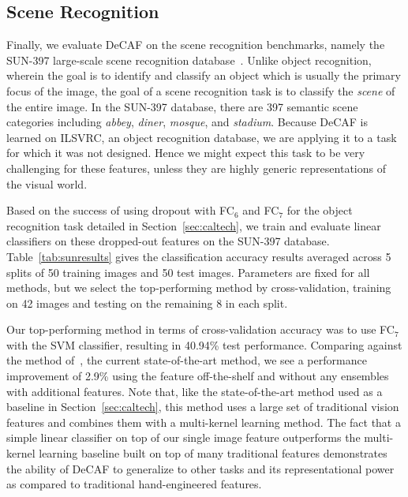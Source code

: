 \subsection{Scene Recognition}
Finally, we evaluate DeCAF on the scene recognition benchmarks, namely the SUN-397 large-scale scene recognition database~\cite{xiao10}. Unlike object recognition, wherein the goal is to identify and classify an object which is usually the primary focus of the image, the goal of a scene recognition task is to classify the \textit{scene} of the entire image.
In the SUN-397 database, there are 397 semantic scene categories including \textit{abbey}, \textit{diner}, \textit{mosque}, and \textit{stadium}.
Because DeCAF is learned on ILSVRC, an object recognition database, we are applying it to a task for which it was not designed.
Hence we might expect this task to be very challenging for these features, unless they are highly generic representations of the visual world.

Based on the success of using dropout with FC$_6$ and FC$_7$ for the object recognition task detailed in Section~\ref{sec:caltech}, we train and evaluate linear classifiers on these dropped-out features on the SUN-397 database.
Table~\ref{tab:sunresults} gives the classification accuracy results averaged across 5 splits of 50 training images and 50 test images.
Parameters are fixed for all methods, but we select the top-performing method by cross-validation, training on 42 images and testing on the remaining 8 in each split.

Our top-performing method in terms of cross-validation accuracy was to use FC$_7$ with the SVM classifier, resulting in 40.94\% test performance.
Comparing against the method of~\cite{xiao10}, the current state-of-the-art method, we see a performance improvement of 2.9\% using the feature off-the-shelf and without any ensembles with additional features.
Note that, like the state-of-the-art method used as a baseline in Section~\ref{sec:caltech}, this method uses a large set of traditional vision features and combines them with a multi-kernel learning method.
The fact that a simple linear classifier on top of our single image feature outperforms the multi-kernel learning baseline built on top of many traditional features demonstrates the ability of DeCAF to generalize to other tasks and its representational power as compared to traditional hand-engineered features.

